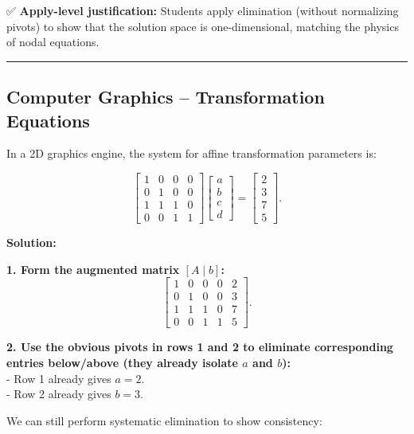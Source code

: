 \documentclass[
  letterpaper,
  DIV=11,
  numbers=noendperiod]{scrreprt}
\begin{document}
✅ \textbf{Apply-level justification:} Students apply elimination
(without normalizing pivots) to show that the solution space is
one-dimensional, matching the physics of nodal equations.

\begin{center}\rule{0.5\linewidth}{0.5pt}\end{center}

\subsection{Computer Graphics -- Transformation
Equations}\label{computer-graphics-transformation-equations}

In a 2D graphics engine, the system for affine transformation parameters
is:

\[
\begin{bmatrix}
1 & 0 & 0 & 0 \\
0 & 1 & 0 & 0 \\
1 & 1 & 1 & 0 \\
0 & 0 & 1 & 1
\end{bmatrix}
\begin{bmatrix} a \\ b \\ c \\ d \end{bmatrix}
=
\begin{bmatrix} 2 \\ 3 \\ 7 \\ 5 \end{bmatrix}.
\]

\textbf{Solution:}

\textbf{1. Form the augmented matrix \([A\mid b]\):} \[
\left[\begin{array}{cccc|c}
1 & 0 & 0 & 0 & 2\\[4pt]
0 & 1 & 0 & 0 & 3\\[4pt]
1 & 1 & 1 & 0 & 7\\[4pt]
0 & 0 & 1 & 1 & 5
\end{array}\right].
\]

\textbf{2. Use the obvious pivots in rows 1 and 2 to eliminate
corresponding entries below/above (they already isolate \(a\) and
\(b\)):}\\
- Row 1 already gives \(a = 2\).\\
- Row 2 already gives \(b = 3\).

We can still perform systematic elimination to show consistency:
\end{document}
